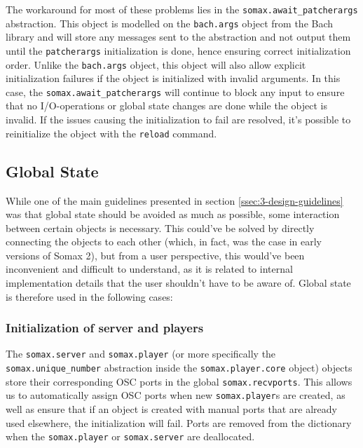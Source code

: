 \noindent The workaround for most of these problems lies in the \texttt{somax.await\_patcherargs} abstraction. This object is modelled on the \texttt{bach.args} object from the Bach library \cite{agostini2012bach} and will store any messages sent to the abstraction and not output them until the \texttt{patcherargs} initialization is done, hence ensuring correct initialization order. Unlike the \texttt{bach.args} object, this object will also allow explicit initialization failures if the object is initialized with invalid arguments. In this case, the \texttt{somax.await\_patcherargs} will continue to block any input to ensure that no I/O-operations or global state changes are done while the object is invalid. If the issues causing the initialization to fail are resolved, it's possible to reinitialize the object with the \texttt{reload} command.


\subsection{Global State}\label{ssec:3-global-state}
While one of the main guidelines presented in section \ref{ssec:3-design-guidelines} was that global state should be avoided as much as possible, some interaction between certain objects is necessary. This could've be solved by directly connecting the objects to each other (which, in fact, was the case in early versions of Somax 2), but from a user perspective, this would've been inconvenient and difficult to understand, as it is related to internal implementation details that the user shouldn't have to be aware of. Global state is therefore used in the following cases:

\subsubsection{Initialization of server and players}
The \texttt{somax.server} and \texttt{somax.player} (or more specifically the \texttt{somax.unique\_number} abstraction inside the \texttt{somax.player.core} object) objects store their corresponding OSC ports in the global \texttt{somax.recvports}. This allows us to automatically assign OSC ports when new \texttt{somax.player}s are created, as well as ensure that if an object is created with manual ports that are already used elsewhere, the initialization will fail. Ports are removed from the dictionary when the \texttt{somax.player} or \texttt{somax.server} are deallocated.

